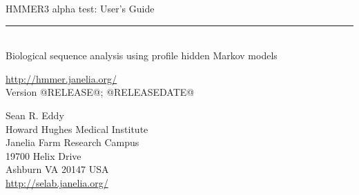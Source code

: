 \begin{titlepage}
{\Large

\vspace*{\fill}

\noindent
{\Huge {HMMER3 alpha test: User's Guide}} \vspace{-8.0pt} \\ 
\rule[2pt]{\textwidth}{1pt} \\
\hspace*{\fill} {\large {Biological sequence analysis using
profile hidden Markov models} \\ }

\vspace*{\fill}

\begin{center}
\url{http://hmmer.janelia.org/}\\
Version @RELEASE@; @RELEASEDATE@ \\ 

\vspace*{\fill}

Sean R. Eddy\\
Howard Hughes Medical Institute\\
Janelia Farm Research Campus\\
19700 Helix Drive\\
Ashburn VA 20147 USA\\
\url{http://selab.janelia.org/} \\
\end{center}

\vspace*{\fill}

}
\end{titlepage}

